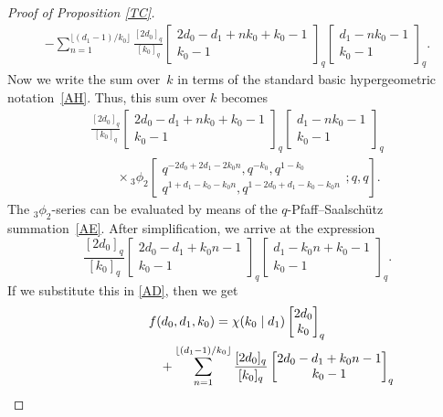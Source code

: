 \documentclass[pdftex]{sigma}
\def\fl#1{\lfloor#1\rfloor}
\begin{document}
\begin{proof}[Proof of Proposition \ref{TC}]
\begin{gather}
-\sum_{n=1}^{\fl{(d_1-1)/k_0}}
\frac {[2d_0]_q} {[k_0]_q}
\begin{bmatrix} 2d_0-d_1+nk_0+k_0-1\\k_0-1\end{bmatrix}_q
\begin{bmatrix} d_1-nk_0-1\\
k_0-1\end{bmatrix}_q.
\label{AD}
\end{gather}
Now we write the sum over~$k$
in terms of the standard basic hypergeometric notation~\eqref{AH}.
Thus, this sum over $k$ becomes
\begin{gather*}
\frac {[2d_0]_q} {[k_0]_q}
\begin{bmatrix} 2d_0-d_1+nk_0+k_0-1\\k_0-1\end{bmatrix}_q
\begin{bmatrix} d_1-nk_0-1\\
k_0-1\end{bmatrix}_q
\\ \qquad{}\times
   {}_3\phi _2 \!\left[\begin{matrix} q^{-2 d_0 + 2 d_1 - 2 k_0 n},
q^{-k_0},q^{1-k_0}\\
q^{1 + d_1 - k_0 - k_0 n},q^{1 - 2 d_0 + d_1 - k_0 - k_0 n}
\end{matrix} ;q,q\right].
\end{gather*}
The $_3\phi_2$-series can be evaluated by means of the
$q$-Pfaff--Saalsch\"utz summation~\eqref{AE}.
After simpli\-fi\-ca\-tion, we arrive at the expression
\begin{equation*}
\frac {[2d_0]_q} {[k_0]_q}
\begin{bmatrix} 2d_0-d_1+k_0n-1\\k_0-1\end{bmatrix}_q
\begin{bmatrix} d_1-k_0n+k_0-1\\k_0-1\end{bmatrix}_q.
\end{equation*}
If we substitute this in \eqref{AD}, then we get
\begin{gather*}
f(d_0,d_1,k_0)=
\chi(k_0\mid d_1)\begin{bmatrix} 2d_0\\k_0\end{bmatrix}_q\\ \hphantom{f(d_0,d_1,k_0)=}{}
+\sum_{n=1}^{\fl{(d_1-1)/k_0}}
\frac {[2d_0]_q} {[k_0]_q}
\begin{bmatrix} 2d_0-d_1+k_0n-1\\k_0-1\end{bmatrix}_q

\end{gather*}
\end{proof}
\end{document}
